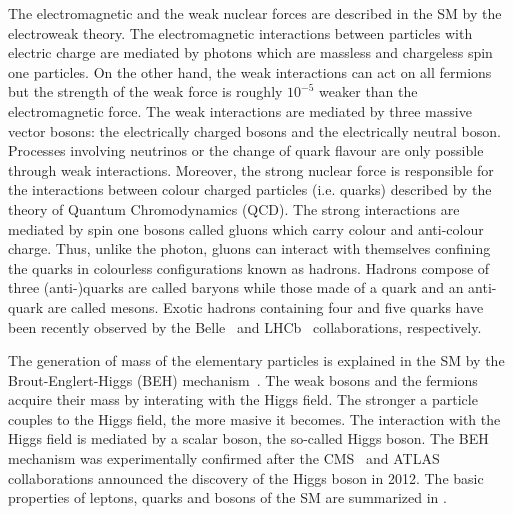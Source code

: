 The electromagnetic and the weak nuclear forces are described in the SM by the electroweak theory. The electromagnetic interactions between particles with electric charge are mediated by photons which are massless and chargeless spin one particles. On the other hand, the weak interactions can act on all fermions but the strength of the weak force is roughly $10^{-5}$ weaker than the electromagnetic force. The weak interactions are mediated by three massive vector bosons: the electrically charged \Wpm bosons and the electrically neutral {\PZ} boson. Processes involving neutrinos or the change of quark flavour are only possible through weak interactions. Moreover, the strong nuclear force is responsible for the interactions between colour charged particles (i.e. quarks) described by the theory of Quantum Chromodynamics (QCD). The strong interactions are mediated by spin one bosons called gluons which carry colour and anti-colour charge. Thus, unlike the photon, gluons can interact with themselves confining the quarks in colourless configurations known as hadrons. Hadrons compose of three (anti-)quarks are called baryons while those made of a quark and an anti-quark are called mesons. Exotic hadrons containing four and five quarks have been recently observed by the Belle~\cite{Tetraquark} and LHCb~\cite{Pentaquarks} collaborations, respectively.

The generation of mass of the elementary particles is explained in the SM by the Brout-Englert-Higgs (BEH) mechanism~\cite{HiggsMechanism_1,HiggsMechanism_2}. The weak bosons and the fermions acquire their mass by interating with the Higgs field. The stronger a particle couples to the Higgs field, the more masive it becomes. The interaction with the Higgs field is mediated by a scalar boson, the so-called Higgs boson. The BEH mechanism was experimentally confirmed after the CMS~\cite{HiggsBoson_CMS} and ATLAS~\cite{HiggsBoson_ATLAS} collaborations announced the discovery of the Higgs boson in 2012. The basic properties of leptons, quarks and bosons of the SM are summarized in .


